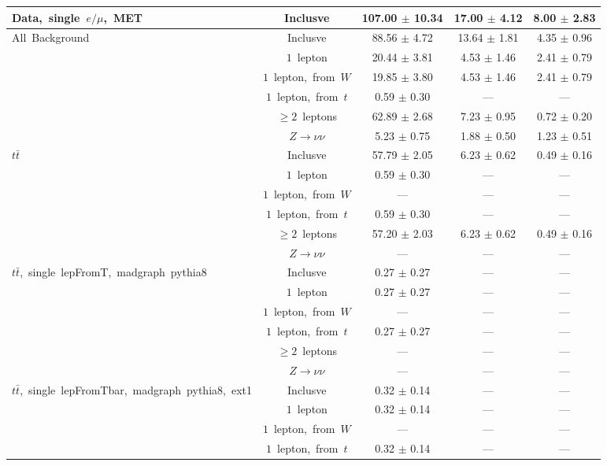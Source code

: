 \documentclass{article}
\begin{document}
\begin{longtable}{|l|c|c|c|c|}
\multirow{1}{*}{Data,~single~$e/\mu$,~MET} & Inclusve  & 107.00 $\pm$ 10.34  & 17.00 $\pm$ 4.12  & 8.00 $\pm$ 2.83 \\* 
\hline \hline 
\multirow{6}{*}{All~Background} & Inclusve  & 88.56 $\pm$ 4.72  & 13.64 $\pm$ 1.81  & 4.35 $\pm$ 0.96 \\* 
 & $1$~lepton  & 20.44 $\pm$ 3.81  & 4.53 $\pm$ 1.46  & 2.41 $\pm$ 0.79 \\* 
 & $1$~lepton,~from~$W$  & 19.85 $\pm$ 3.80  & 4.53 $\pm$ 1.46  & 2.41 $\pm$ 0.79 \\* 
 & $1$~lepton,~from~$t$  & 0.59 $\pm$ 0.30  & ---  & --- \\* 
 & $\ge2$~leptons  & 62.89 $\pm$ 2.68  & 7.23 $\pm$ 0.95  & 0.72 $\pm$ 0.20 \\* 
 & $Z\rightarrow\nu\nu$  & 5.23 $\pm$ 0.75  & 1.88 $\pm$ 0.50  & 1.23 $\pm$ 0.51 \\* 
\hline 
\multirow{6}{*}{$t\bar{t}$} & Inclusve  & 57.79 $\pm$ 2.05  & 6.23 $\pm$ 0.62  & 0.49 $\pm$ 0.16 \\* 
 & $1$~lepton  & 0.59 $\pm$ 0.30  & ---  & --- \\* 
 & $1$~lepton,~from~$W$  & ---  & ---  & --- \\* 
 & $1$~lepton,~from~$t$  & 0.59 $\pm$ 0.30  & ---  & --- \\* 
 & $\ge2$~leptons  & 57.20 $\pm$ 2.03  & 6.23 $\pm$ 0.62  & 0.49 $\pm$ 0.16 \\* 
 & $Z\rightarrow\nu\nu$  & ---  & ---  & --- \\* 
\hline 
\multirow{6}{*}{$t\bar{t}$,~single~lepFromT,~madgraph~pythia8} & Inclusve  & 0.27 $\pm$ 0.27  & ---  & --- \\* 
 & $1$~lepton  & 0.27 $\pm$ 0.27  & ---  & --- \\* 
 & $1$~lepton,~from~$W$  & ---  & ---  & --- \\* 
 & $1$~lepton,~from~$t$  & 0.27 $\pm$ 0.27  & ---  & --- \\* 
 & $\ge2$~leptons  & ---  & ---  & --- \\* 
 & $Z\rightarrow\nu\nu$  & ---  & ---  & --- \\* 
\hline 
\multirow{6}{*}{$t\bar{t}$,~single~lepFromTbar,~madgraph~pythia8,~ext1} & Inclusve  & 0.32 $\pm$ 0.14  & ---  & --- \\* 
 & $1$~lepton  & 0.32 $\pm$ 0.14  & ---  & --- \\* 
 & $1$~lepton,~from~$W$  & ---  & ---  & --- \\* 
 & $1$~lepton,~from~$t$  & 0.32 $\pm$ 0.14  & ---  & --- \\* 

\end{longtable}
\end{document}
